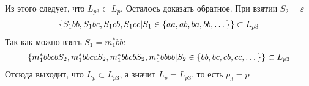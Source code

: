 Из этого следует, что \(L_{p3} \subset L_p\). Осталось доказать обратное.
При взятии \(S_2 = \varepsilon\)
\begin{align*}
  \left\{S_1bb, S_1bc, S_1cb, S_1cc | S_1 \in \left\{aa, ab, ba, bb, \dots\right\}\right\} \subset L_{p3}
\end{align*}
Так как можно взять \(S_1 = m_1^*bb\):
\begin{align*}
  \left\{m_1^*bbcbS_2, m_1^*bbccS_2, m_1^*bbcbS_2, m_1^*bbbb | S_2 \in \left\{bb, bc, cb, cc, \dots\right\}\right\} \subset L_{p3}
\end{align*}
Отсюда выходит, что \(L_p \subset L_{p3}\), а значит \(L_p = L_{p3}\), то есть \(p_3 = p\)

